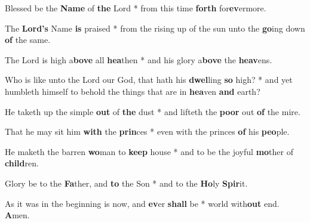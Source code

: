 \begin{multicols}{2}
	Blessed be the \textbf{Name} of \textbf{the} Lord * from this time \textbf{forth} for\textbf{ev}ermore.
	
	The \textbf{Lord's} Name \textbf{is} praised * from the rising up of the sun unto the \textbf{go}ing down \textbf{of} the same.
	
	The Lord is high a\textbf{bove} all \textbf{ hea}then * and his glory a\textbf{bove} the \textbf{heav}ens.
	
	Who is like unto the Lord our God, that hath his \textbf{dwel}ling \textbf{so} high? * and yet humbleth himself to behold the things that are in \textbf{hea}ven \textbf{and} earth?
	
	He taketh up the simple \textbf{out} of \textbf{the} dust * and lifteth the \textbf{poor} out \textbf{of} the mire.
	
	That he may sit him \textbf{with} the \textbf{prin}ces * even with the princes \textbf{of} his \textbf{peo}ple.
	
	He maketh the barren \textbf{wo}man to \textbf{keep} house * and to be the joyful \textbf{mo}ther of \textbf{child}ren.
	
	Glory be to the \textbf{Fa}ther, and \textbf{to} the Son * and to the \textbf{Ho}ly \textbf{Spir}it.
	
	As it was in the beginning is now, and \textbf{ev}er \textbf{shall} be * world with\textbf{out} end. \textbf{A}men.
\end{multicols}